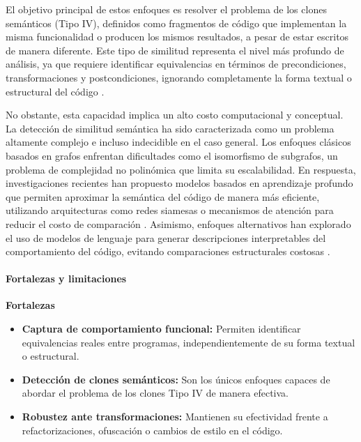 El objetivo principal de estos enfoques es resolver el problema de los clones semánticos (Tipo IV), definidos como fragmentos de código que implementan la misma funcionalidad o producen los mismos resultados, a pesar de estar escritos de manera diferente. Este tipo de similitud representa el nivel más profundo de análisis, ya que requiere identificar equivalencias en términos de precondiciones, transformaciones y postcondiciones, ignorando completamente la forma textual o estructural del código \cite{Roy2007Survey, Yu2023Graph}.

No obstante, esta capacidad implica un alto costo computacional y conceptual. La detección de similitud semántica ha sido caracterizada como un problema altamente complejo e incluso indecidible en el caso general. Los enfoques clásicos basados en grafos enfrentan dificultades como el isomorfismo de subgrafos, un problema de complejidad no polinómica que limita su escalabilidad. En respuesta, investigaciones recientes han propuesto modelos basados en aprendizaje profundo que permiten aproximar la semántica del código de manera más eficiente, utilizando arquitecturas como redes siamesas o mecanismos de atención para reducir el costo de comparación \cite{Yu2023Graph}. Asimismo, enfoques alternativos han explorado el uso de modelos de lenguaje para generar descripciones interpretables del comportamiento del código, evitando comparaciones estructurales costosas \cite{Gagnon2025Beyond}.

\paragraph{Fortalezas y limitaciones}

\textbf{Fortalezas}
\begin{itemize}
    \item \textbf{Captura de comportamiento funcional:} Permiten identificar equivalencias reales entre programas, independientemente de su forma textual o estructural.
    
    \item \textbf{Detección de clones semánticos:} Son los únicos enfoques capaces de abordar el problema de los clones Tipo IV de manera efectiva.
    
    \item \textbf{Robustez ante transformaciones:} Mantienen su efectividad frente a refactorizaciones, ofuscación o cambios de estilo en el código.
\end{itemize}


